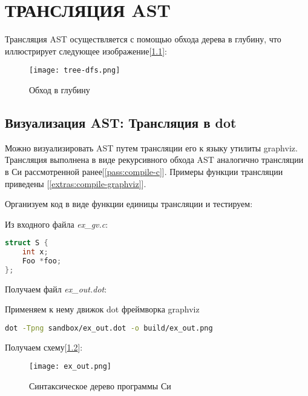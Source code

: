 \chapter{ТРАНСЛЯЦИЯ AST}

Трансляция AST осуществляется с помощью обхода дерева в глубину, что иллюстрирует следующее изображение[\ref{pass:compile-c:dfs-diag}]:

\begin{figure}[h!]
    \texttt{[image: tree-dfs.png]}
    \centering
    \caption{Обход в глубину}
    \label{pass:compile-c:dfs-diag}
\end{figure}
\FloatBarrier

\section{Визуализация AST: Трансляция в dot}
\label{pass:compile-dot}

Можно визуализировать AST путем трансляции его к языку  утилиты graphviz.
Трансляция выполнена в виде рекурсивного обхода AST аналогично трансляции в Си рассмотренной ранее[\ref{pass:compile-c}].
Примеры функции трансляции приведены [\ref{extras:compile-graphviz}].

Организуем код в виде функции единицы трансляции и тестируем:



Из входного файла \textit{ex\_gv.c}:

\begin{lstlisting}[language=c, caption={ex\_gv.c}]
struct S {
    int x;
    Foo *foo;
};
\end{lstlisting}

Получаем файл \textit{ex\_out.dot}:


\clearpage
Применяем к нему движок dot фреймворка graphviz
\begin{lstlisting}[language=bash]
dot -Tpng sandbox/ex_out.dot -o build/ex_out.png
\end{lstlisting}

Получаем схему[\ref{graphviz:struct}]:

\begin{figure}[h!]
    \texttt{[image: ex\_out.png]}
    \centering
    \caption{Синтаксическое дерево программы Си}
    \label{graphviz:struct}
\end{figure}

